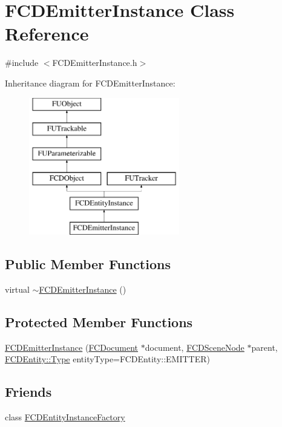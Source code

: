 \hypertarget{classFCDEmitterInstance}{
\section{FCDEmitterInstance Class Reference}
\label{classFCDEmitterInstance}
}


{\ttfamily \#include $<$FCDEmitterInstance.h$>$}

Inheritance diagram for FCDEmitterInstance:\begin{figure}[H]
\begin{center}
\leavevmode
\includegraphics[height=6.000000cm]{classFCDEmitterInstance}
\end{center}
\end{figure}
\subsection*{Public Member Functions}
\begin{DoxyCompactItemize}
\item 
virtual \hyperlink{classFCDEmitterInstance_a2a130dc123cdf1ed9c62fb87db99524f}{$\sim$FCDEmitterInstance} ()
\end{DoxyCompactItemize}
\subsection*{Protected Member Functions}
\begin{DoxyCompactItemize}
\item 
\hyperlink{classFCDEmitterInstance_adb603a8e31948ff5f77412233ec1ce0d}{FCDEmitterInstance} (\hyperlink{classFCDocument}{FCDocument} $\ast$document, \hyperlink{classFCDSceneNode}{FCDSceneNode} $\ast$parent, \hyperlink{classFCDEntity_a9301a4bd5f4d4190ec13e40db4effdd7}{FCDEntity::Type} entityType=FCDEntity::EMITTER)
\end{DoxyCompactItemize}
\subsection*{Friends}
\begin{DoxyCompactItemize}
\item 
\hypertarget{classFCDEmitterInstance_a069ebb98497ccbc5fdcb75ecfa8b15f7}{
class \hyperlink{classFCDEmitterInstance_a069ebb98497ccbc5fdcb75ecfa8b15f7}{FCDEntityInstanceFactory}}
\label{classFCDEmitterInstance_a069ebb98497ccbc5fdcb75ecfa8b15f7}

\end{DoxyCompactItemize}



